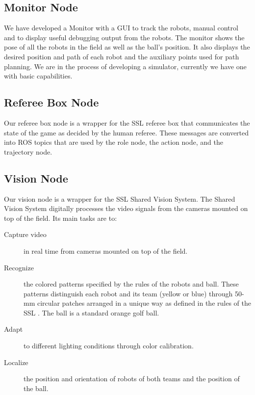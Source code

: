 \documentclass[]{llncs}
\newcommand{\TODO}[1]{{\textcolor{blue}{ToDo: {#1}}}}
\begin{document}
\subsection{Monitor Node}
We have developed a Monitor with a GUI to track the robots, manual control and to display useful debugging output from the robots. The monitor shows the pose of all the robots in the field as well as the ball's position. It also displays the desired position and path of each robot and the auxiliary points used for path planning. We are in the process of developing a simulator, currently we have one with basic capabilities.



\subsection{Referee Box Node}
Our referee box node is a wrapper for the SSL referee box that communicates the state of the game as decided by
the human referee. These messages are converted into ROS topics that are used by the role node, the action node, and the trajectory node.


\subsection{Vision Node}
Our vision node is a wrapper for the SSL Shared Vision System. The Shared Vision System \cite{zlbwv-sslvtsvsftrcssl-RoboCup-2009} digitally processes the video signals from the cameras mounted on top of the field. Its main tasks are to:
\begin{description}
	\item[Capture video] in real time from cameras mounted on top of the field.
	\item[Recognize] the colored patterns specified by the rules of the robots and ball. These patterns distinguish each robot and its team (yellow or blue) through 50-mm circular patches arranged in a unique way as defined in the rules of the SSL \cite{robocup-ssl-rules}. The ball is a standard orange golf ball.
	\item[Adapt] to different lighting conditions through color calibration.
	\item[Localize] the position and orientation of robots of both teams and the position of the ball.
\end{description}
\end{document}
